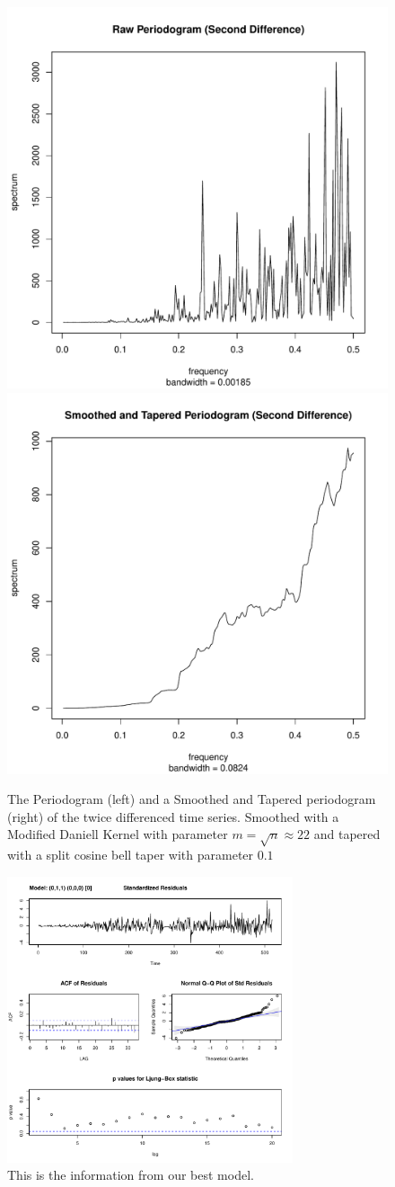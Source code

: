 \documentclass[11pt]{paper}
\begin{document}
\begin{figure}[h]
\centering
\includegraphics[width=0.45\linewidth]{../image/raw_periodogram_2.pdf}
\includegraphics[width=0.45\linewidth]{../image/smooth_tapered_periodogram_2.pdf}
\caption{The Periodogram (left) and a Smoothed and Tapered periodogram (right) of the twice differenced time series. Smoothed with a Modified Daniell Kernel with parameter $m = \sqrt{n} \approx 22$ and tapered with a split cosine bell taper with parameter $0.1$}
\label{periodogram2}
\end{figure}

\begin{figure}[h]
\centering
    \includegraphics[width=0.75\textwidth]{../image/best_model.pdf}
\caption{This is the information from our best model.}
\label{best_model}
\end{figure}
\end{document}
